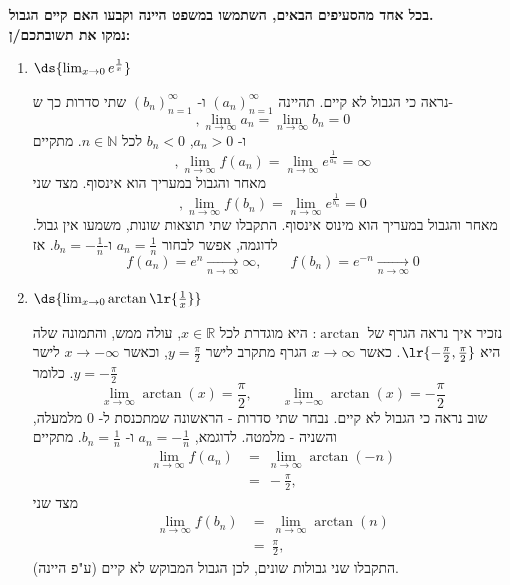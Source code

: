 \textbf{
בכל אחד מהסעיפים הבאים, השתמשו במשפט היינה וקבעו האם קיים הגבול. \\
נמקו את תשובתכם/ן:}

\begin{enumerate}

\item $\ds{\lim_{x \to 0} e^{\frac{1}{x}}}$
\ifsol
{}
\begin{solbox}
נראה כי הגבול לא קיים.
תהיינה
$(a_n)_{n=1}^\infty$
ו-
$(b_n)_{n=1}^\infty$
שתי סדרות כך ש-
$$,\lim_{n\to\infty}a_n=\lim_{n\to\infty}b_n=0$$
ו-
$a_n>0$, $b_n<0$
לכל
$n\in\mathbb{N}$.
מתקיים
$$,\displaystyle\lim_{n\to\infty}f(a_n)=\lim_{n\to\infty}e^{\frac{1}{a_n}}
=\infty$$
מאחר והגבול במעריך הוא אינסוף.
מצד שני
$$,\displaystyle\lim_{n\to\infty}f(b_n)=\lim_{n\to\infty}e^{\frac{1}{b_n}}=0$$
מאחר והגבול במעריך הוא מינוס אינסוף.
התקבלו שתי תוצאות שונות, משמעו אין גבול.
לדוגמה, אפשר לבחור $a_n=\frac1n$ ו-$b_n=-\frac1n$. אז
$$f(a_n)=e^{n}\xrightarrow[n\to\infty]{}\infty,\qquad f(b_n)=e^{-n}\xrightarrow[n\to\infty]{}0$$
\end{solbox}
\fi

\item $\ds{\lim_{x \to 0} \arctan\lr{ \frac{1}{x} } }$
\ifsol
{}
\begin{solbox}
נזכיר איך נראה הגרף של $\arctan$: היא מוגדרת לכל $x\in\mathbb{R}$, עולה ממש, והתמונה שלה היא $\lr{-\frac\pi2,\frac\pi2}$. כאשר $x\to\infty$ הגרף מתקרב לישר $y=\frac\pi2$, וכאשר $x\to-\infty$ לישר $y=-\frac\pi2$. כלומר
$$\lim_{x\to\infty}\arctan(x)=\frac\pi2,\qquad \lim_{x\to-\infty}\arctan(x)=-\frac\pi2$$
שוב נראה כי הגבול לא קיים. נבחר שתי סדרות - הראשונה שמתכנסת ל-
$0$
מלמעלה, והשניה - מלמטה.
לדוגמא,
$a_n=-\tfrac{1}{n}$
ו-
$b_n=\tfrac{1}{n}$.
מתקיים
\begin{align*}
\displaystyle\lim_{n\to\infty}f(a_n)
&=\ \displaystyle\lim_{n\to\infty}\arctan(-n)\\
&=\ -\frac{\pi}{2},
\end{align*}
מצד שני
\begin{align*}
\displaystyle\lim_{n\to\infty}f(b_n)
&=\ \displaystyle\lim_{n\to\infty}\arctan(n)\\
&=\ \frac{\pi}{2},
\end{align*}
התקבלו שני גבולות שונים, לכן הגבול המבוקש לא קיים
(ע"פ היינה).
\end{solbox}
\fi


\end{enumerate}
